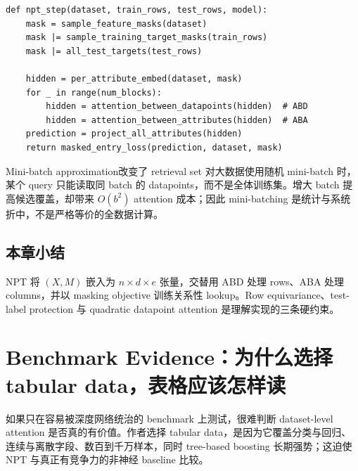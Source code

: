 \documentclass[a4paper]{article}
\begin{document}

\begin{lstlisting}[caption={NPT forward 与随机 mask 的概念性伪代码。}]
def npt_step(dataset, train_rows, test_rows, model):
    mask = sample_feature_masks(dataset)
    mask |= sample_training_target_masks(train_rows)
    mask |= all_test_targets(test_rows)

    hidden = per_attribute_embed(dataset, mask)
    for _ in range(num_blocks):
        hidden = attention_between_datapoints(hidden)  # ABD
        hidden = attention_between_attributes(hidden)  # ABA
    prediction = project_all_attributes(hidden)
    return masked_entry_loss(prediction, dataset, mask)
\end{lstlisting}

\begin{warningbox}{Mini-batch approximation改变了 retrieval set}
对大数据使用随机 mini-batch 时，某个 query 只能读取同 batch 的 datapoints，而不是全体训练集。增大 batch 提高候选覆盖，却带来 $O(b^2)$ attention 成本；因此 mini-batching 是统计与系统折中，不是严格等价的全数据计算。
\end{warningbox}


\subsection{本章小结}

NPT 将 $(X,M)$ 嵌入为 $n\times d\times e$ 张量，交替用 ABD 处理 rows、ABA 处理 columns，并以 masking objective 训练关系性 lookup。Row equivariance、test-label protection 与 quadratic datapoint attention 是理解实现的三条硬约束。

\section{Benchmark Evidence：为什么选择 tabular data，表格应该怎样读}

如果只在容易被深度网络统治的 benchmark 上测试，很难判断 dataset-level attention 是否真的有价值。作者选择 tabular data，是因为它覆盖分类与回归、连续与离散字段、数百到千万样本，同时 tree-based boosting 长期强势；这迫使 NPT 与真正有竞争力的非神经 baseline 比较。
\end{document}
